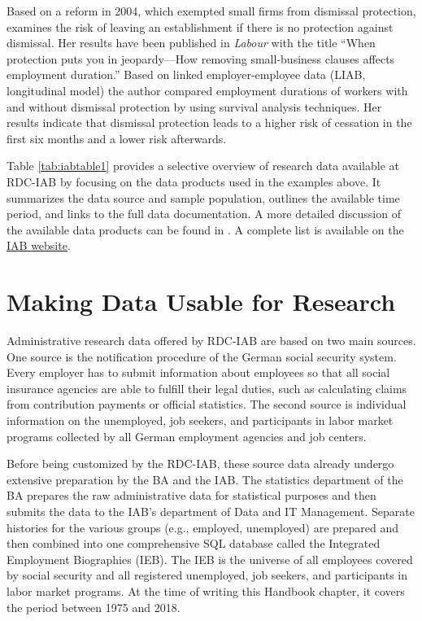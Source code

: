 Based on a reform in 2004, which exempted small firms from dismissal protection, \citep{lucke2018} examines the risk of leaving an establishment if there is no protection against dismissal. Her results have been published in \emph{Labour} with the title ``When protection puts you in jeopardy---How removing small-business clauses affects employment duration.'' Based on linked employer-employee data (LIAB, longitudinal model) the author compared employment durations of workers with and without dismissal protection by using survival analysis techniques. Her results indicate that dismissal protection leads to a higher risk of cessation in the first six months and a lower risk afterwards.

Table \ref{tab:iabtable1} provides a selective overview of research data available at RDC-IAB by focusing on the data products used in the examples above. It summarizes the data source and sample population, outlines the available time period, and links to the full data documentation. A more detailed discussion of the available data products can be found in \citep{muller2019, muller2020}. A complete list is available on the \href{https://fdz.iab.de/en/FDZ_Overview_of_Data.aspx}{IAB website}.



\hypertarget{making-data-usable-for-research}{%
\section{Making Data Usable for Research}\label{making-data-usable-for-research}}

Administrative research data offered by RDC-IAB are based on two main sources. One source is the notification procedure of the German social security system. Every employer has to submit information about employees so that all social insurance agencies are able to fulfill their legal duties, such as calculating claims from contribution payments or official statistics. The second source is individual information on the unemployed, job seekers, and participants in labor market programs collected by all German employment agencies and job centers.

Before being customized by the RDC-IAB, these source data already undergo extensive preparation by the BA and the IAB. The statistics department of the BA prepares the raw administrative data for statistical purposes and then submits the data to the IAB's department of Data and IT Management. Separate histories for the various groups (e.g., employed, unemployed) are prepared and then combined into one comprehensive SQL database called the Integrated Employment Biographies (IEB). The IEB is the universe of all employees covered by social security and all registered unemployed, job seekers, and participants in labor market programs. At the time of writing this Handbook chapter, it covers the period between 1975 and 2018.

